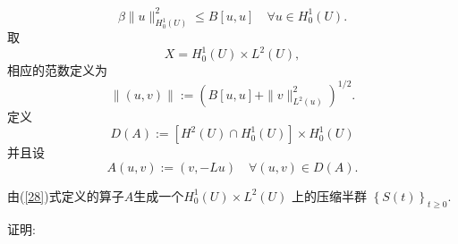   \begin{equation}\label{26}
    \beta\|u\|^2_{H^{1}_0(U)}\le B[u,u]\quad \forall u \in H_0^{1}(U).
  \end{equation}
  取
   \[
     X=H_0^{1}(U)\times L^2(U),
  \] 
  相应的范数定义为
  \begin{equation}\label{27}
    \|(u,v)\|:=(B[u,u]+\|v\|^2_{L^2(u)})^{1 /2}.
  \end{equation}
  定义
  \[
    D(A):=[H^2(U)\cap H_0^{1}(U)]\times H_0^{1}(U)
  \] 
  并且设
  \begin{equation}\label{28}
    A(u,v):=(v,-Lu) \quad \forall (u,v)\in D(A).
  \end{equation}
  \begin{theorem}
    由{\normalfont (\ref{28})}式定义的算子$A$生成一个$H_0^{1}(U)\times L^2(U)$ 上的压缩半群 $\left\{S(t)\right\} _{t\ge 0}$.
\end{theorem}
证明:
